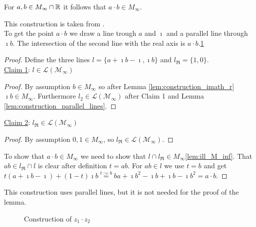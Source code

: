 \begin{lemma}
    \label{lem:construction_mul}
    \leanok
    For $a, b \in M_{\infty}\cap\mathbb{R}$ it follows that $a \cdot b \in M_{\infty}$.
\end{lemma}
This construction is taken from \cite{cox2012galois}.\\
To get the point $a\cdot b$ we draw a line trough $a$ and $\imath$ and a parallel line through $\imath b$. The intersection of the second line with the real axis is $a\cdot b$.\ref{Fig.5} 
\begin{proof}
    \leanok
    Define the three lines $l = \{a+\imath b - \imath, \imath b\}$ and $l_{\Re} = \{1,0\}$.\\
    \underline{Claim 1}: $l \in \mathcal{L(M_{\infty})}$
    \begin{proof}
        By assumption $b \in M_{\infty}$ so after Lemma \ref{lem:construction_imath_r} $\imath b \in M_{\infty}$. Furthermore $l_2 \in \mathcal{L(M_{\infty})}$ after Claim 1 and Lemma \ref{lem:construction_parallel_lines}.
    \end{proof}
    \underline{Claim 2}: $l_{\Re} \in \mathcal{L(M_{\infty})}$
    \begin{proof}
        By assumption $0, 1 \in M_{\infty}$, so $l_{\Re} \in \mathcal{L(M_{\infty})}$.
    \end{proof}
    To show that $a\cdot b \in M_{\infty}$ we need to show that $l \cap l_{\Re} \in M_{\infty}$\ref{lem:ill_M_inf}. That $ab \in l_{\Re} \cap l$ is clear after definition $t=ab$. For $ab \in l$ we use $t=b$ and get $t(a+\imath b - \imath) + (1-t)\imath b  \stackrel{t:=b}{=}ba + \imath b^2 -\imath b + \imath b -\imath b^2 = a\cdot b$.
\end{proof}
\begin{remark}
    This construction uses parallel lines, but it is not needed for the proof of the lemma.
\end{remark}
\begin{figure}[!h]
    \centering
    \caption{Construction of $z_1 \cdot z_2$}
    \label{Fig.5}
\end{figure}

